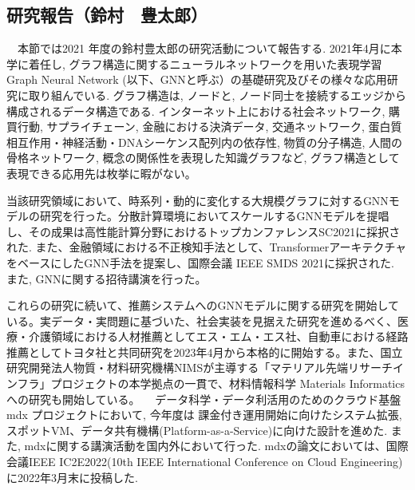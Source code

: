 
\subsection{研究報告（鈴村　豊太郎）}

　本節では2021 年度の鈴村豊太郎の研究活動について報告する. 2021年4月に本学に着任し, グラフ構造に関するニューラルネットワークを用いた表現学習 Graph Neural Network (以下、GNNと呼ぶ）の基礎研究及びその様々な応用研究に取り組んでいる. グラフ構造は, ノードと, ノード同士を接続するエッジから構成されるデータ構造である. インターネット上における社会ネットワーク, 購買行動, サプライチェーン, 金融における決済データ, 交通ネットワーク, 蛋白質相互作用・神経活動・DNAシーケンス配列内の依存性, 物質の分子構造, 人間の骨格ネットワーク, 概念の関係性を表現した知識グラフなど, グラフ構造として表現できる応用先は枚挙に暇がない。
\par
当該研究領域において、時系列・動的に変化する大規模グラフに対するGNNモデルの研究を行った。分散計算環境においてスケールするGNNモデルを提唱し、その成果は高性能計算分野におけるトップカンファレンスSC2021\cite{suzumura-sc2021}に採択された. また、金融領域における不正検知手法として、TransformerアーキテクチャをベースにしたGNN手法を提案し、国際会議 IEEE SMDS 2021\cite{suzumura-smds21}に採択された. また, GNNに関する招待講演\cite{suzumura-canon2021}を行った。

これらの研究に続いて、推薦システムへのGNNモデルに関する研究を開始している。実データ・実問題に基づいた、社会実装を見据えた研究を進めるべく、医療・介護領域における人材推薦としてエス・エム・エス社、自動車における経路推薦としてトヨタ社と共同研究を2023年4月から本格的に開始する。また、国立研究開発法人物質・材料研究機構NIMSが主導する「マテリアル先端リサーチインフラ」プロジェクトの本学拠点の一貫で、材料情報科学 Materials Informaticsへの研究も開始している。
　データ科学・データ利活用のためのクラウド基盤 mdx プロジェクトにおいて, 今年度は 課金付き運用開始に向けたシステム拡張,スポットVM、データ共有機構(Platform-as-a-Service)に向けた設計を進めた. また, mdxに関する講演活動を国内外において行った\cite{suzumura-axies2021,suzumura-nanotec2021, suzumura-nci2021}. mdxの論文においては、国際会議IEEE IC2E2022(10th IEEE International Conference on Cloud Engineering) に2022年3月末に投稿した. 

